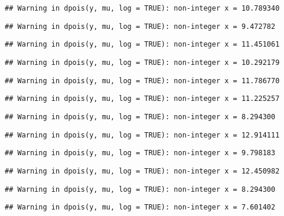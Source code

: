 \documentclass[
]{article}
\begin{document}
\begin{verbatim}
## Warning in dpois(y, mu, log = TRUE): non-integer x = 10.789340
\end{verbatim}

\begin{verbatim}
## Warning in dpois(y, mu, log = TRUE): non-integer x = 9.472782
\end{verbatim}

\begin{verbatim}
## Warning in dpois(y, mu, log = TRUE): non-integer x = 11.451061
\end{verbatim}

\begin{verbatim}
## Warning in dpois(y, mu, log = TRUE): non-integer x = 10.292179
\end{verbatim}

\begin{verbatim}
## Warning in dpois(y, mu, log = TRUE): non-integer x = 11.786770
\end{verbatim}

\begin{verbatim}
## Warning in dpois(y, mu, log = TRUE): non-integer x = 11.225257
\end{verbatim}

\begin{verbatim}
## Warning in dpois(y, mu, log = TRUE): non-integer x = 8.294300
\end{verbatim}

\begin{verbatim}
## Warning in dpois(y, mu, log = TRUE): non-integer x = 12.914111
\end{verbatim}

\begin{verbatim}
## Warning in dpois(y, mu, log = TRUE): non-integer x = 9.798183
\end{verbatim}

\begin{verbatim}
## Warning in dpois(y, mu, log = TRUE): non-integer x = 12.450982
\end{verbatim}

\begin{verbatim}
## Warning in dpois(y, mu, log = TRUE): non-integer x = 8.294300
\end{verbatim}

\begin{verbatim}
## Warning in dpois(y, mu, log = TRUE): non-integer x = 7.601402
\end{verbatim}
\end{document}
